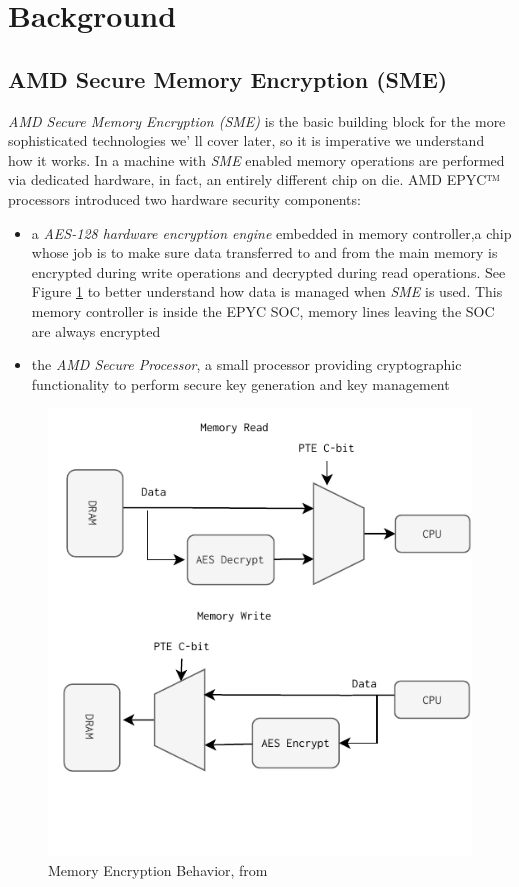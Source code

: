 \documentclass[twocolumn]{article}
\begin{document}
\section{Background}
\subsection{AMD Secure Memory Encryption (SME)}

\textit{AMD Secure Memory Encryption (SME)} is the basic building block for the more sophisticated technologies we' ll cover later, so it is imperative we understand how it works. In a machine with \textit{SME} enabled memory operations are performed via dedicated hardware, in fact, an entirely different chip on die. AMD EPYC™ processors introduced two hardware security components:

\begin{itemize}
    \item a \textit{AES-128 hardware encryption engine} embedded in memory controller,a chip whose job is to make sure data transferred to and from the main memory is encrypted during write operations and decrypted during read operations. See Figure \ref{fig:memory-encryption-fig} to better understand how data is managed when \textit{SME} is used. This memory controller is inside the EPYC SOC, memory lines leaving the SOC are always encrypted
    \item the \textit{AMD Secure Processor}, a small processor providing cryptographic functionality to perform secure key generation and key management
\end{itemize}

\begin{figure}
    \centering
    \includegraphics[scale=0.9]{img/read-write.pdf}
    \caption{Memory Encryption Behavior, from \cite{memory-encryption}}
    \label{fig:memory-encryption-fig}
\end{figure}
\end{document}
